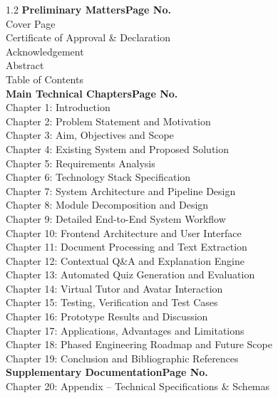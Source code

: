 \documentclass[11pt,a4paper]{report}
\begin{document}
\begin{spacing}{1.2}
\noindent\textbf{Preliminary Matters}\hfill\textbf{Page No.}\\
Cover Page \\
Certificate of Approval \& Declaration \\
Acknowledgement \\
Abstract \\
Table of Contents \\[0.3cm]
\textbf{Main Technical Chapters}\hfill\textbf{Page No.}\\
Chapter 1: Introduction \\
Chapter 2: Problem Statement and Motivation \\
Chapter 3: Aim, Objectives and Scope \\
Chapter 4: Existing System and Proposed Solution \\
Chapter 5: Requirements Analysis \\
Chapter 6: Technology Stack Specification \\
Chapter 7: System Architecture and Pipeline Design \\
Chapter 8: Module Decomposition and Design \\
Chapter 9: Detailed End-to-End System Workflow \\
Chapter 10: Frontend Architecture and User Interface \\
Chapter 11: Document Processing and Text Extraction \\
Chapter 12: Contextual Q\&A and Explanation Engine \\
Chapter 13: Automated Quiz Generation and Evaluation \\
Chapter 14: Virtual Tutor and Avatar Interaction \\
Chapter 15: Testing, Verification and Test Cases \\
Chapter 16: Prototype Results and Discussion \\
Chapter 17: Applications, Advantages and Limitations \\
Chapter 18: Phased Engineering Roadmap and Future Scope \\
Chapter 19: Conclusion and Bibliographic References \\[0.3cm]
\textbf{Supplementary Documentation}\hfill\textbf{Page No.}\\
Chapter 20: Appendix -- Technical Specifications \& Schemas 
\end{spacing}
\clearpage
\end{document}
